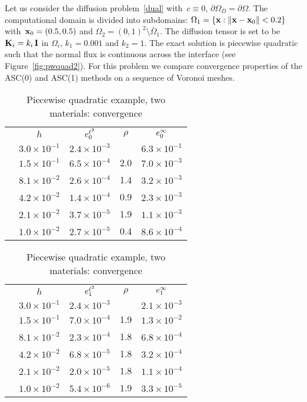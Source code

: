 Let us consider the diffusion problem~\eqref{dual} with~$c \equiv 0$, $\partial\Omega_D = \partial\Omega$. The computational domain is divided into subdomains: $\Omega_1 = \{ {\bf x} : \|{\bf x} - {\bf x}_0\|< 0.2\}$ with~${\bf x}_0 = (0.5,0.5)$ and $\Omega_2 = (0,1)^2 \setminus \bar{\Omega}_1$. The diffusion tensor is set to be $\boldsymbol{\mathbf{K}}_i = k_i\,\boldsymbol{\mathbf{I}}$ in $\Omega_i$, $k_1 = 0.001$ and $k_2=1$. The exact solution is piecewise quadratic such that the normal flux is continuous across the interface (see Figure~\ref{fig:pwquad2}). For this problem we compare convergence properties of the  ASC(0) and ASC(1) methods on a sequence of Voronoi meshes.

\begin{table}[h!]
	\centering
	\caption{Piecewise quadratic example, two materials: convergence \label{tab:conv:pwquad2}}
	\footnotesize
	\begin{tabular}[1.1]{| c | c || c | c || c |}
		\hline
		\multirow{7}{*}{\rotatebox{90}{ASC(0)}} & $h$ & $e^{{\ell^2}}_{0}$ & ${\rho}$ & $e^{\infty}_{0}$ \\
		\cline{2-5}
		& $3.0\times10^{-1}$ & $2.4\times10^{-3}$ & & $6.3\times10^{-1}$ \\
		\cline{2-5}
		& $1.5\times10^{-1}$ & $6.5\times10^{-4}$ & 2.0 & $7.0\times10^{-3}$ \\
		\cline{2-5}
		& $8.1\times10^{-2}$ & $2.6\times10^{-4}$ & 1.4 & $3.2\times10^{-3}$ \\
		\cline{2-5}
		& $4.2\times10^{-2}$ & $1.4\times10^{-4}$ & 0.9 & $2.3\times10^{-3}$ \\
		\cline{2-5}
		& $2.1\times10^{-2}$ & $3.7\times10^{-5}$ & 1.9 & $1.1\times10^{-3}$ \\
		\cline{2-5}
		& $1.0\times10^{-2}$ & $2.7\times10^{-5}$ & 0.4 & $8.6\times10^{-4}$ \\
		\hline
	\end{tabular}
	\begin{tabular}[1.1]{| c | c || c | c || c |}
		\hline
		\multirow{7}{*}{\rotatebox{90}{ASC(1)}} & $h$ & $e^{{\ell^2}}_{1}$ & ${\rho}$ & $e^{\infty}_{1}$ \\
		\cline{2-5}
		& $3.0\times10^{-1}$ & $2.4\times10^{-3}$ & & $2.1\times10^{-3}$ \\
		\cline{2-5}
		& {$1.5\times10^{-1}$} & $7.0\times10^{-4}$ & 1.9 & {$1.3\times10^{-2}$} \\
		\cline{2-5}
		& $8.1\times10^{-2}$ & $2.3\times10^{-4}$ & 1.8 & $6.8\times10^{-4}$ \\
		\cline{2-5}
		& $4.2\times10^{-2}$ & $6.8\times10^{-5}$ & 1.8 & $3.2\times10^{-4}$ \\
		\cline{2-5}
		& $2.1\times10^{-2}$ & $2.0\times10^{-5}$ & 1.8 & $1.1\times10^{-4}$ \\
		\cline{2-5}
		& $1.0\times10^{-2}$ & $5.4\times10^{-6}$ & 1.9 & $3.3\times10^{-5}$ \\
		\hline
	\end{tabular}
\end{table}

